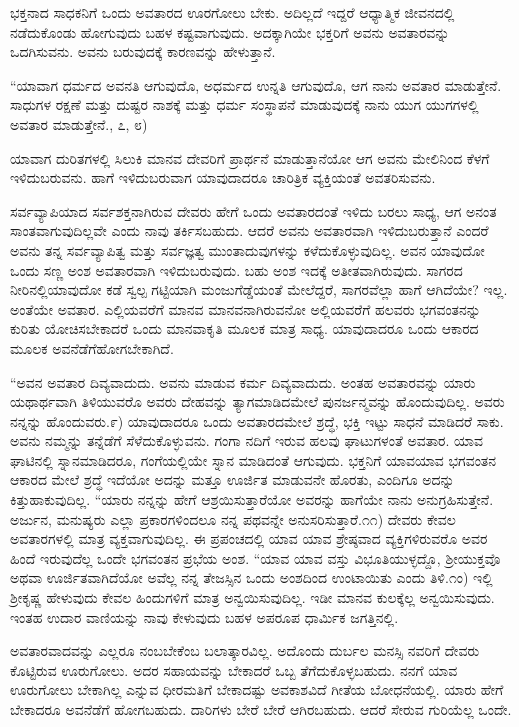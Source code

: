 ಭಕ್ತನಾದ ಸಾಧಕನಿಗೆ ಒಂದು ಅವತಾರದ ಊರಗೋಲು ಬೇಕು. ಅದಿಲ್ಲದೆ ಇದ್ದರೆ ಆಧ್ಯಾತ್ಮಿಕ ಜೀವನದಲ್ಲಿ ನಡೆದುಕೊಂಡು ಹೋಗುವುದು ಬಹಳ ಕಷ್ಟವಾಗುವುದು. ಅದಕ್ಕಾಗಿಯೇ ಭಕ್ತರಿಗೆ ಅವನು ಅವತಾರವನ್ನು ಒದಗಿಸುವನು. ಅವನು ಬರುವುದಕ್ಕೆ ಕಾರಣವನ್ನು ಹೇಳುತ್ತಾನೆ.

“ಯಾವಾಗ ಧರ್ಮದ ಅವನತಿ ಆಗುವುದೊ, ಅಧರ್ಮದ ಉನ್ನತಿ ಆಗುವುದೊ, ಆಗ ನಾನು ಅವತಾರ ಮಾಡುತ್ತೇನೆ. ಸಾಧುಗಳ ರಕ್ಷಣೆ ಮತ್ತು ದುಷ್ಟರ ನಾಶಕ್ಕೆ ಮತ್ತು ಧರ್ಮ ಸಂಸ್ಥಾಪನೆ ಮಾಡುವುದಕ್ಕೆ ನಾನು ಯುಗ ಯುಗಗಳಲ್ಲಿ ಅವತಾರ ಮಾಡುತ್ತೇನೆ., ೭, ೮)

ಯಾವಾಗ ದುರಿತಗಳಲ್ಲಿ ಸಿಲುಕಿ ಮಾನವ ದೇವರಿಗೆ ಪ್ರಾರ್ಥನೆ ಮಾಡುತ್ತಾನೆಯೋ ಆಗ ಅವನು ಮೇಲಿನಿಂದ ಕೆಳಗೆ ಇಳಿದುಬರುವನು. ಹಾಗೆ ಇಳಿದುಬರುವಾಗ ಯಾವುದಾದರೂ ಚಾರಿತ್ರಿಕ ವ್ಯಕ್ತಿಯಂತೆ ಅವತರಿಸುವನು.

ಸರ್ವವ್ಯಾಪಿಯಾದ ಸರ್ವಶಕ್ತನಾಗಿರುವ ದೇವರು ಹೇಗೆ ಒಂದು ಅವತಾರದಂತೆ ಇಳಿದು ಬರಲು ಸಾಧ್ಯ, ಆಗ ಅನಂತ ಸಾಂತವಾಗುವುದಿಲ್ಲವೇ ಎಂದು ನಾವು ತರ್ಕಿಸಬಹುದು. ಆದರೆ ಅವನು ಅವತಾರವಾಗಿ ಇಳಿದುಬರುತ್ತಾನೆ ಎಂದರೆ ಅವನು ತನ್ನ ಸರ್ವವ್ಯಾಪಿತ್ವ ಮತ್ತು ಸರ್ವಜ್ಞತ್ವ ಮುಂತಾದುವುಗಳನ್ನು ಕಳೆದುಕೊಳ್ಳುವುದಿಲ್ಲ. ಅವನ ಯಾವುದೋ ಒಂದು ಸಣ್ಣ ಅಂಶ ಅವತಾರವಾಗಿ ಇಳಿದುಬರುವುದು. ಬಹು ಅಂಶ ಇದಕ್ಕೆ ಅತೀತವಾಗಿರುವುದು. ಸಾಗರದ ನೀರಿನಲ್ಲಿ\break ಯಾವುದೋ ಕಡೆ ಸ್ವಲ್ಪ ಗಟ್ಟಿಯಾಗಿ ಮಂಜುಗೆಡ್ಡೆಯಂತೆ ಮೇಲೆದ್ದರೆ, ಸಾಗರವೆಲ್ಲಾ ಹಾಗೆ ಆಗಿದೆಯೇ? ಇಲ್ಲ. ಅಂತೆಯೇ ಅವತಾರ. ಎಲ್ಲಿಯವರೆಗೆ ಮಾನವ ಮಾನವನಾಗಿರುವನೋ ಅಲ್ಲಿಯ\-ವರೆಗೆ ಹಲವರು ಭಗವಂತನನ್ನು ಕುರಿತು ಯೋಚಿಸಬೇಕಾದರೆ ಒಂದು ಮಾನವಾಕೃತಿ ಮೂಲಕ ಮಾತ್ರ ಸಾಧ್ಯ. ಯಾವುದಾದರೂ ಒಂದು ಆಕಾರದ ಮೂಲಕ ಅವನೆಡೆಗೆ\break ಹೋಗಬೇಕಾಗಿದೆ.

“ಅವನ ಅವತಾರ ದಿವ್ಯವಾದುದು. ಅವನು ಮಾಡುವ ಕರ್ಮ ದಿವ್ಯವಾದುದು. ಅಂತಹ ಅವತಾರವನ್ನು ಯಾರು ಯಥಾರ್ಥವಾಗಿ ತಿಳಿಯುವರೊ ಅವರು ದೇಹವನ್ನು ತ್ಯಾಗಮಾಡಿದ\-ಮೇಲೆ ಪುನರ್ಜನ್ಮವನ್ನು ಹೊಂದುವುದಿಲ್ಲ. ಅವರು ನನ್ನನ್ನು ಹೊಂದುವರು.೯) ಯಾವುದಾದರೂ ಒಂದು ಅವತಾರದಮೇಲೆ ಶ್ರದ್ಧೆ, ಭಕ್ತಿ ಇಟ್ಟು ಸಾಧನೆ ಮಾಡಿದರೆ ಸಾಕು. ಅವನು ನಮ್ಮನ್ನು ತನ್ನೆಡೆಗೆ ಸೆಳೆದುಕೊಳ್ಳುವನು. ಗಂಗಾ ನದಿಗೆ ಇರುವ ಹಲವು ಘಾಟುಗಳಂತೆ ಅವತಾರ. ಯಾವ ಘಾಟಿನಲ್ಲಿ ಸ್ನಾನಮಾಡಿದರೂ, ಗಂಗೆಯಲ್ಲಿಯೇ ಸ್ನಾನ ಮಾಡಿದಂತೆ ಆಗುವುದು. ಭಕ್ತನಿಗೆ ಯಾವಯಾವ ಭಗವಂತನ ಆಕಾರದ ಮೇಲೆ ಶ್ರದ್ಧೆ ಇದೆಯೋ ಅದನ್ನು ಮತ್ತೂ ಊರ್ಜಿತ ಮಾಡುವನೇ ಹೊರತು, ಎಂದಿಗೂ ಅದನ್ನು ಕಿತ್ತುಹಾಕುವುದಿಲ್ಲ. “ಯಾರು ನನ್ನನ್ನು ಹೇಗೆ ಆಶ್ರಯಿಸುತ್ತಾರೆಯೋ ಅವರನ್ನು ಹಾಗೆಯೇ ನಾನು ಅನುಗ್ರಹಿಸುತ್ತೇನೆ. ಅರ್ಜುನ, ಮನುಷ್ಯರು ಎಲ್ಲಾ ಪ್ರಕಾರಗಳಿಂದಲೂ ನನ್ನ ಪಥವನ್ನೇ ಅನುಸರಿಸುತ್ತಾರೆ.೧೧) ದೇವರು ಕೇವಲ ಅವತಾರಗಳಲ್ಲಿ ಮಾತ್ರ ವ್ಯಕ್ತವಾಗುವುದಿಲ್ಲ. ಈ ಪ್ರಪಂಚದಲ್ಲಿ ಯಾವ ಯಾವ ಶ್ರೇಷ್ಠವಾದ ವ್ಯಕ್ತಿಗಳಿರುವರೊ ಅವರ ಹಿಂದೆ ಇರುವುದೆಲ್ಲ ಒಂದೇ ಭಗವಂತನ ಪ್ರಭೆಯ ಅಂಶ. “ಯಾವ ಯಾವ ವಸ್ತು ವಿಭೂತಿಯುಳ್ಳದ್ದೊ, ಶ‍್ರೀಯುಕ್ತವೊ ಅಥವಾ ಊರ್ಜಿತವಾಗಿದೆಯೋ ಅವೆಲ್ಲ ನನ್ನ ತೇಜಸ್ಸಿನ ಒಂದು ಅಂಶದಿಂದ ಉಂಟಾಯಿತು ಎಂದು ತಿಳಿ.೧ಂ) ಇಲ್ಲಿ ಶ‍್ರೀಕೃಷ್ಣ ಹೇಳುವುದು ಕೇವಲ ಹಿಂದುಗಳಿಗೆ ಮಾತ್ರ ಅನ್ವಯಿಸುವುದಿಲ್ಲ. ಇಡೀ ಮಾನವ ಕುಲಕ್ಕೆಲ್ಲ ಅನ್ವಯಿಸುವುದು. ಇಂತಹ ಉದಾರ ವಾಣಿಯನ್ನು ನಾವು ಕೇಳುವುದು ಬಹಳ ಅಪರೂಪ ಧಾರ್ಮಿಕ ಜಗತ್ತಿನಲ್ಲಿ.

ಅವತಾರವಾದವನ್ನು ಎಲ್ಲರೂ ನಂಬಬೇಕೆಂಬ ಬಲಾತ್ಕಾರವಿಲ್ಲ. ಅದೊಂದು ದುರ್ಬಲ ಮನಸ್ಸಿ ನವರಿಗೆ ದೇವರು ಕೊಟ್ಟಿರುವ ಊರುಗೋಲು. ಅದರ ಸಹಾಯವನ್ನು ಬೇಕಾದರೆ ಒಬ್ಬ ತೆಗೆದುಕೊಳ್ಳಬಹುದು. ನನಗೆ ಯಾವ ಊರುಗೋಲು ಬೇಕಾಗಿಲ್ಲ ಎನ್ನುವ ಧೀರಮತಿಗೆ ಬೇಕಾದಷ್ಟು ಅವಕಾಶವಿದೆ ಗೀತೆಯ ಬೋಧನೆಯಲ್ಲಿ. ಯಾರು ಹೇಗೆ ಬೇಕಾದರೂ ಅವನೆಡೆಗೆ ಹೋಗಬಹುದು. ದಾರಿಗಳು ಬೇರೆ ಬೇರೆ ಆಗಿರಬಹುದು. ಆದರೆ ಸೇರುವ ಗುರಿಯೆಲ್ಲ ಒಂದೇ.


